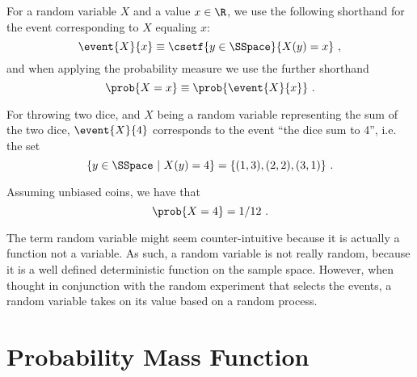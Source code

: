 \begin{flex}
\begin{gram}[Notation]
For a random variable $X$ and a value $x \in \R$, we use the following
shorthand for the event corresponding to $X$ equaling $x$:
\[\event{X}{x} \equiv \csetf{y \in \SSpace}{X(y)  = x}~,\]
and when applying the probability measure we use the further
shorthand
\[\prob{X = x} \equiv \prob{\event{X}{x}}~.\]
\end{gram}

\begin{example}
  For throwing two dice, and $X$ being a random variable representing
  the sum of the two dice, $\event{X}{4}$ corresponds to the
  event ``the dice sum to 4'', i.e. the set
  \[\{y \in \SSpace~|~X(y) = 4\} = \{(1,3),(2,2),(3,1)\}~.\]

  Assuming unbiased coins, we have that
  \[\prob{X = 4} = 1/12~.\]
\end{example}
\end{flex}

\begin{remark}
The term random variable might seem counter-intuitive
because it is actually a function not a variable.
%
As such, a random variable is not really random, because it is a well
defined deterministic function on the sample space.  
%
However, when thought in conjunction with the random experiment that
selects the events, a random variable takes on its value based on a
random process.
\end{remark}

\section{Probability Mass Function}
\label{sec:probability::randvar::pmf}

